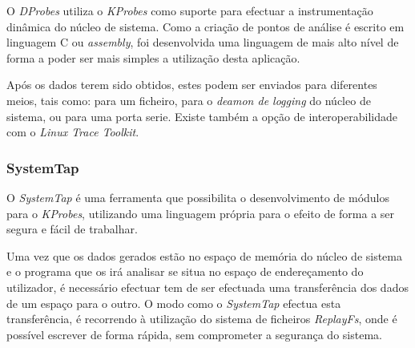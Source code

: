 
O \textit{DProbes} utiliza o \textit{KProbes} como suporte para efectuar a instrumentação dinâmica do núcleo de sistema. Como a criação de pontos de análise é escrito em linguagem C ou \textit{assembly}, foi desenvolvida uma linguagem de mais alto nível de forma a poder ser mais simples a utilização desta aplicação.

Após os dados terem sido obtidos, estes podem ser enviados para diferentes meios, tais como: para um ficheiro, para o \textit{deamon de logging} do núcleo de sistema, ou para uma porta serie.
Existe também a opção de interoperabilidade com o \textit{Linux Trace Toolkit}\cite{:DProbes}.

\subsubsection{SystemTap}\label{cap:Systemtap_overview}
O \textit{SystemTap} é uma ferramenta que possibilita o desenvolvimento de módulos para o \textit{KProbes}, utilizando uma linguagem própria para o efeito de forma a ser segura e fácil de trabalhar.



Uma vez que os dados gerados estão no espaço de memória do núcleo de sistema e o programa que os irá analisar se situa no espaço de endereçamento do utilizador, é necessário efectuar tem de ser efectuada uma transferência dos dados de um espaço para o outro.
O modo como o \textit{SystemTap} efectua esta transferência, é recorrendo à utilização do sistema de ficheiros \textit{ReplayFs}, onde é possível escrever de forma rápida, sem comprometer a segurança do sistema.\cite{Donovan2007,Jones2009} 

